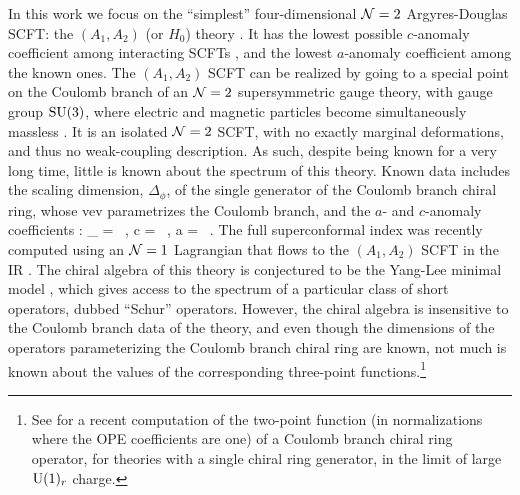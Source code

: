 \medskip

In this work we focus on the ``simplest'' four-dimensional ${\mathcal{N}}=2$ Argyres-Douglas SCFT: the $(A_1,A_2)$ (or $H_0$) theory \cite{Argyres:1995jj,Argyres:1995xn}. It has the lowest possible $c$-anomaly coefficient among interacting SCFTs \cite{Liendo:2015ofa}, and the lowest $a$-anomaly coefficient among the known ones. The $(A_1,A_2)$ SCFT can be realized by going to a special point on the Coulomb branch of an ${\mathcal{N}}=2$ supersymmetric gauge theory, with gauge group $\mathrm{SU}(3)$, where electric and magnetic particles become simultaneously massless \cite{Argyres:1995jj,Argyres:1995xn}.
It is an isolated ${\mathcal{N}}=2$ SCFT, with no exactly marginal deformations, and thus no weak-coupling description. As such, despite being known for a very long time, little is known about the spectrum of this theory.
Known data includes the scaling dimension, $\Delta_{\phi}$, of the single generator of the Coulomb branch chiral ring, whose vev parametrizes the Coulomb branch, and the $a$- and $c$-anomaly coefficients \cite{Aharony:2016kai}:
\be 
\Delta_{\phi} = \, , \qquad c = \, , \qquad a = \, .
\label{eq:acanomalies_dimension}
\ee
The full superconformal index \cite{Kinney:2005ej,Gadde:2011uv,Rastelli:2014jja} was recently computed using an ${\mathcal{N}}=1$ Lagrangian that flows to the $(A_1,A_2)$ SCFT in the IR \cite{Maruyoshi:2016tqk}. 
The chiral algebra of this theory is conjectured to be the Yang-Lee minimal  model \cite{rastelli_harvard,Beem:2017ooy}, which gives access to the spectrum of a particular class of short operators, dubbed ``Schur'' operators.
%
However, the chiral algebra is insensitive to the Coulomb branch data of the theory, and even though the dimensions of the  operators parameterizing the Coulomb branch chiral ring are known, not much is known about the values of the corresponding three-point functions.\footnote{See \cite{Hellerman:2017sur} for a recent computation of the two-point function (in normalizations where the OPE coefficients are one) of a Coulomb branch chiral ring operator, for theories with a single chiral ring generator, in the limit of large $\mathrm{U}(1)_r$ charge.}


